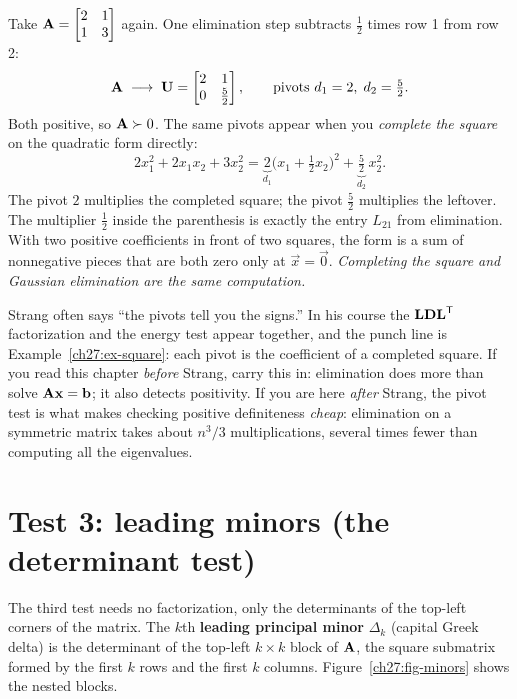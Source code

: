 \begin{example}
\label{ch27:ex-square}
Take $\mathbf{A} = \begin{bmatrix} 2 & 1 \\ 1 & 3 \end{bmatrix}$ again. One elimination step subtracts
$\tfrac12$ times row 1 from row 2:
\[
  \mathbf{A} \;\longrightarrow\;
  \mathbf{U} = \begin{bmatrix} 2 & 1 \\ 0 & \tfrac52 \end{bmatrix},
  \qquad \text{pivots } d_1 = 2,\; d_2 = \tfrac52.
\]
Both positive, so $\mathbf{A}\succ 0$. The same pivots appear when you \emph{complete the square} on
the quadratic form directly:
\[
  2x_1^2 + 2x_1 x_2 + 3x_2^2
  = \underbrace{2}_{d_1}\Big(x_1 + \tfrac12 x_2\Big)^2 + \underbrace{\tfrac52}_{d_2}\, x_2^2 .
\]
The pivot $2$ multiplies the completed square; the pivot $\tfrac52$ multiplies the leftover. The
multiplier $\tfrac12$ inside the parenthesis is exactly the entry $L_{21}$ from elimination. With
two positive coefficients in front of two squares, the form is a sum of nonnegative pieces that are
both zero only at $\vec{x}=\vec{0}$. \emph{Completing the square and Gaussian elimination are the
same computation.}
\end{example}

\begin{strangbox}
Strang often says ``the pivots tell you the signs.'' In his course the $\mathbf{LDL}^{\mathsf{T}}$ factorization
and the energy test appear together, and the punch line is Example~\ref{ch27:ex-square}: each pivot
is the coefficient of a completed square. If you read this chapter \emph{before} Strang, carry this
in: elimination does more than solve $\mathbf{A}\mathbf{x}=\mathbf{b}$; it also detects positivity. If you
are here \emph{after} Strang, the pivot test is what makes checking positive definiteness
\emph{cheap}: elimination on a symmetric matrix takes about $n^3/3$ multiplications, several times
fewer than computing all the eigenvalues.
\end{strangbox}

\section{Test 3: leading minors (the determinant test)}

The third test needs no factorization, only the determinants of the top-left corners of the matrix.
The $k$th \textbf{leading principal minor} $\Delta_k$ (capital Greek delta) is the determinant of
the top-left $k\times k$ block of $\mathbf{A}$, the square submatrix formed by the first $k$ rows and
the first $k$ columns. Figure~\ref{ch27:fig-minors} shows the nested blocks.

